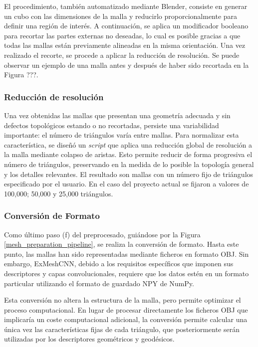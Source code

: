El procedimiento, también automatizado mediante Blender, consiste en generar un cubo con las dimensiones de la malla y reducirlo proporcionalmente para definir una región de interés. A continuación, se aplica un modificador booleano para recortar las partes externas no deseadas, lo cual es posible gracias a que todas las mallas están previamente alineadas en la misma orientación. Una vez realizado el recorte, se procede a aplicar la reducción de resolución. Se puede observar un ejemplo de una malla antes y después de haber sido recortada en la Figura ???.

\subsubsection{Reducción de resolución}
\label{section4:data_reduction}
Una vez obtenidas las mallas que presentan una geometría adecuada y sin defectos topológicos estando o no recortadas, persiste una variabilidad importante: el número de triángulos varía entre mallas. Para normalizar esta característica, se diseñó un \textit{script} que aplica una reducción global de resolución a la malla mediante colapso de aristas. Esto permite reducir de forma progresiva el número de triángulos, preservando en la medida de lo posible la topología general y los detalles relevantes. El resultado son mallas con un número fijo de triángulos especificado por el usuario. En el caso del proyecto actual se fijaron a valores de 100,000; 50,000 y 25,000 triángulos.

\subsubsection{Conversión de Formato}
Como último paso (f) del preprocesado, guiándose por la Figura \ref{mesh_preparation_pipeline}, se realiza la conversión de formato. Hasta este punto, las mallas han sido representadas mediante ficheros en formato OBJ. Sin embargo, ExMeshCNN, debido a los requisitos específicos que imponen sus descriptores y capas convolucionales, requiere que los datos estén en un formato particular utilizando el formato de guardado NPY de NumPy.

Esta conversión no altera la estructura de la malla, pero permite optimizar el proceso computacional. En lugar de procesar directamente los ficheros OBJ que implicaría un coste computacional adicional, la conversión permite calcular una única vez las características fijas de cada triángulo, que posteriormente serán utilizadas por los descriptores geométricos y geodésicos.

